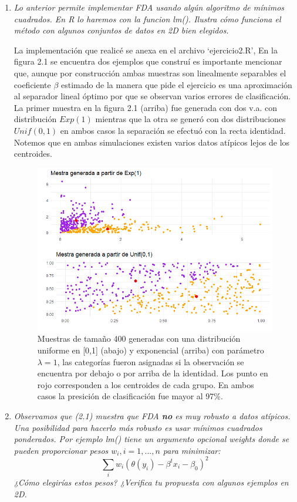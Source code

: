 \documentclass[paper=letter, fontsize=11pt]{scrartcl}
\numberwithin{equation}{section} %
\numberwithin{figure}{section} %
\numberwithin{table}{section} %
\begin{document}
\begin{enumerate}
\item \textit{Lo anterior permite implementar FDA usando algún algoritmo de mínimos cuadrados.
En R lo haremos con la funcion lm(). Ilustra cómo funciona el método con algunos conjuntos de datos en 2D bien elegidos.}

La implementación que realicé se anexa en el archivo ‘ejercicio2.R’, En la figura 2.1 se encuentra dos ejemplos que construí es importante mencionar que, aunque por construcción ambas muestras son linealmente separables el coeficiente $\beta$ estimado de la manera que pide el ejercicio es una aproximación al separador lineal óptimo por que se observan varios errores de clasificación. La primer muestra en la figura 2.1 (arriba) fue generada con dos v.a. con distribución $Exp(1)$ mientras que la otra se generó con dos distribuciones $Unif(0,1)$ en ambos casos la separación se efectuó con la recta identidad. Notemos que en ambas simulaciones existen varios datos atípicos lejos de los centroides.
 


\begin{figure}[H]
  \begin{center}
    \includegraphics[scale=.7]{aprox_lda_unif.png}
    \caption{Muestras de tamaño 400 generadas con una distribución uniforme en [0,1] (abajo) y exponencial (arriba) con parámetro $\lambda = 1$, las categorías fueron asignadas si la observación se encuentra por debajo o por arriba de la identidad. Los punto en rojo corresponden a los centroides de cada grupo. En ambos casos la presición de clasificación fue mayor al 97\%.  }
    \label{figura2_1}
  \end{center}
\end{figure}
\FloatBarrier


\item \textit{Observamos que (2.1) muestra que FDA \textbf{no} es muy robusto a datos atípicos.\\
Una posibilidad para hacerlo más robusto es usar mínimos cuadrados ponderados. Por
ejemplo lm() tiene un argumento opcional weights donde se pueden proporcionar pesos $w_i,i = 1,..., n$ para minimizar:}
\[
\sum_i w_i (\theta(y_i)-\beta^tx_i-\beta_0)^2
\]
\textit{¿Cómo elegirías estos pesos? ¿Verifica tu propuesta con algunos ejemplos en 2D.}
\end{enumerate}
\end{document}

